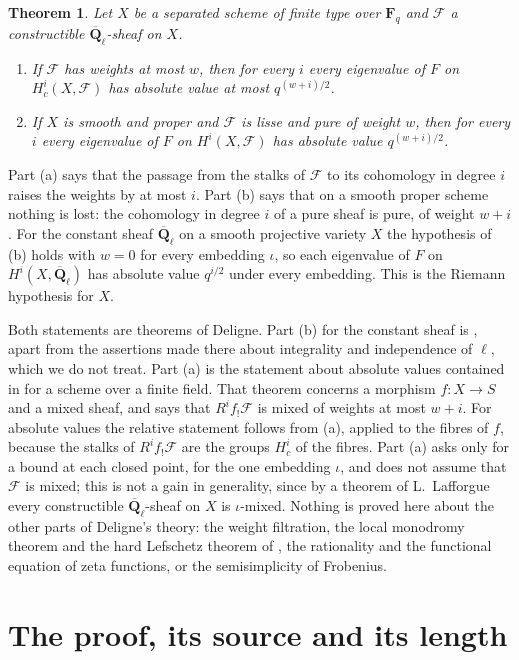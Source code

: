 \documentclass[11pt,a4paper]{article}
\theoremstyle{plain}
\newtheorem{theorem}{Theorem}
\theoremstyle{remark}
\newcommand{\Fq}{\mathbf F_q}
\newcommand{\Ql}{\overline{\mathbf Q}_\ell}
\newcommand{\F}{\mathcal F}
\begin{document}
\begin{theorem}\label{thm:main}
Let $X$ be a separated scheme of finite type over $\Fq$ and $\F$ a constructible $\Ql$-sheaf on $X$.
\begin{enumerate}
\item[(a)] If $\F$ has weights at most $w$, then for every $i$ every eigenvalue of $F$ on $H^i_c(X,\F)$ has absolute
value at most $q^{(w+i)/2}$.
\item[(b)] If $X$ is smooth and proper and $\F$ is lisse and pure of weight $w$, then for every $i$ every eigenvalue
of $F$ on $H^i(X,\F)$ has absolute value $q^{(w+i)/2}$.
\end{enumerate}
\end{theorem}

Part (a) says that the passage from the stalks of $\F$ to its cohomology in degree $i$ raises the weights by at most
$i$. Part (b) says that on a smooth proper scheme nothing is lost: the cohomology in degree $i$ of a pure sheaf is
pure, of weight $w+i$. For the constant sheaf $\Ql$ on a smooth projective variety $X$ the hypothesis of (b) holds
with $w=0$ for every embedding $\iota$, so each eigenvalue of $F$ on $H^i(X,\Ql)$ has absolute value $q^{i/2}$ under
every embedding. This is the Riemann hypothesis for $X$.

Both statements are theorems of Deligne. Part (b) for the constant sheaf is \cite[Th\'eor\`eme 1.6]{WeilI}, apart
from the assertions made there about integrality and independence of $\ell$, which we do not treat. Part (a) is the
statement about absolute values contained in \cite[Th\'eor\`eme 3.3.1]{WeilII} for a scheme over a finite field. That
theorem concerns a morphism $f:X\to S$ and a mixed sheaf, and says that $R^if_!\F$ is mixed of weights at most $w+i$.
For absolute values the relative statement follows from (a), applied to the fibres of $f$, because the stalks of
$R^if_!\F$ are the groups $H^i_c$ of the fibres. Part (a) asks only for a bound at each closed point, for the one
embedding $\iota$, and does not assume that $\F$ is mixed; this is not a gain in generality, since by a theorem of
L.~Lafforgue \cite[Th\'eor\`eme VII.6 and Corollaire VII.8]{Lafforgue} every constructible $\Ql$-sheaf on $X$ is
$\iota$-mixed. Nothing is proved here about the other parts of Deligne's theory: the weight filtration, the local
monodromy theorem and the hard Lefschetz theorem of \cite{WeilII}, the rationality and the functional equation of
zeta functions, or the semisimplicity of Frobenius.

\section{The proof, its source and its length}
\end{document}

